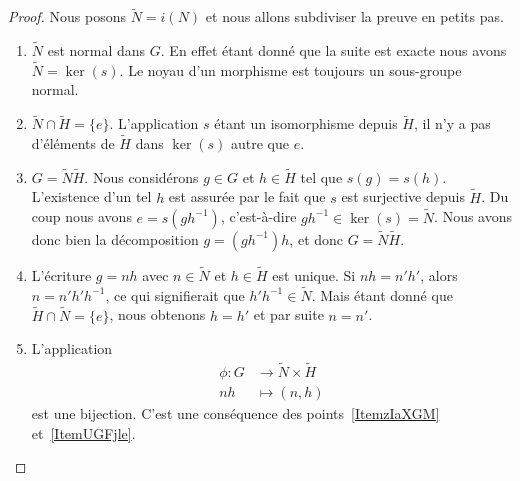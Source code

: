 \begin{proof}
	Nous posons \( \tilde N=i(N)\) et nous allons subdiviser la preuve en petits pas.

	\begin{enumerate}
		\item \( \tilde N\) est normal dans \( G\). En effet étant donné que la suite est exacte nous avons \( \tilde N=\ker(s)\). Le noyau d'un morphisme est toujours un sous-groupe normal.

		\item \( \tilde N\cap\tilde H=\{ e \}\). L'application \( s\) étant un isomorphisme depuis \( \tilde H\), il n'y a pas d'éléments de \( \tilde H\) dans \( \ker(s)\) autre que \( e\).

		\item   \label{ItemzIaXGM} \( G=\tilde N\tilde H\). Nous considérons \( g\in G\) et \( h\in \tilde H\) tel que \( s(g)=s(h)\). L'existence d'un tel \( h\) est assurée par le fait que \( s\) est surjective depuis \( \tilde H\). Du coup nous avons \( e=s(gh^{-1})\), c'est-à-dire \( gh^{-1}\in \ker (s)=\tilde N\). Nous avons donc bien la décomposition \( g=(gh^{-1})h\), et donc \( G=\tilde N\tilde H\).

		\item   \label{ItemUGFjle} L'écriture \( g=nh\) avec \( n\in \tilde N\) et \( h\in \tilde H\) est unique. Si \( nh=n'h'\), alors \( n=n'h'h^{-1}\), ce qui signifierait que \( h'h^{-1}\in\tilde N\). Mais étant donné que \( \tilde H\cap\tilde N=\{ e \}\), nous obtenons \( h=h'\) et par suite \( n=n'\).

		\item   \label{ItemUZlrKo}
		      L'application
		      \begin{equation}
			      \begin{aligned}
				      \phi\colon G & \to \tilde N\times \tilde H \\
				      nh           & \mapsto (n,h)
			      \end{aligned}
		      \end{equation}
		      est une bijection. C'est une conséquence des points~\ref{ItemzIaXGM} et~\ref{ItemUGFjle}.


\end{enumerate}
\end{proof}
